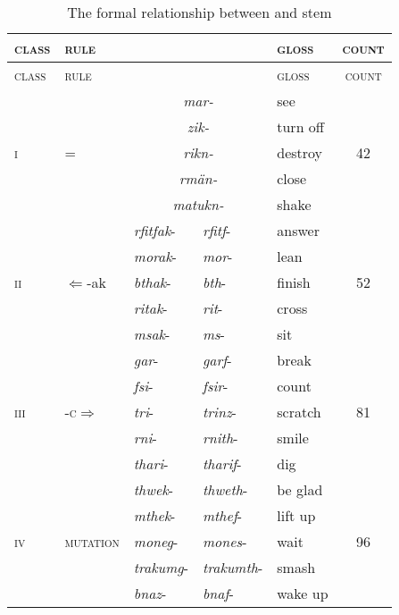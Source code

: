 \begin{table}
\caption{The formal relationship between \Ext{} and \Rs{} stem}
\begin{tabularx}{\textwidth}{lllllc}
\label{frbearr}\\
	\lsptoprule
	\textsc{class}&\textsc{rule} &\Ext{} &\Rs{} &\textsc{gloss} &\textsc{count}\\\hline
	\textsc{class}&\textsc{rule} &\Ext{} &\Rs{} &\textsc{gloss} &\textsc{count}\\\hline
	\multirow{5}{*}{\textsc{i}}	&\multirow{5}{*}{\Ext{}=\Rs{}} &\multicolumn{2}{c}{\emph{mar-}} &see &\multirow{5}{*}{\textsc{42}}\\
	&&\multicolumn{2}{c}{\emph{zik-}} &turn off &\\
	&&\multicolumn{2}{c}{\emph{rikn-}} &destroy &\\
	&&\multicolumn{2}{c}{\emph{rmän-}} &close &\\
	&&\multicolumn{2}{c}{\emph{matukn-}} &shake &\\\hline
	\multirow{5}{*}{\textsc{ii}} &\multirow{5}{*}{\Ext{}$\Leftarrow$\Rs-ak} &\emph{rfitfak}- &\emph{rfitf}- &answer &\multirow{5}{*}{\textsc{52}}\\
	&&\emph{morak}- &\emph{mor}- &lean &\\
	&&\emph{bthak}- &\emph{bth}- &finish &\\
	&&\emph{ritak}-	&\emph{rit}- &cross &\\
	&&\emph{msak}- &\emph{ms}-	&sit &\\\hline
	\multirow{5}{*}{\textsc{iii}} &\multirow{5}{*}{\Ext-\textsc{c}$\Rightarrow$\Rs} &\emph{gar}- &\emph{garf}- &break &\multirow{5}{*}{\textsc{81}}\\
	&&\emph{fsi}- &\emph{fsir}- &count &\\
	&&\emph{tri}- &\emph{trinz}- &scratch &\\
	&&\emph{rni}- &\emph{rnith}- &smile &\\
	&&\emph{thari}- &\emph{tharif}-	&dig &\\\hline
	\multirow{5}{*}{\textsc{iv}} &\multirow{5}{*}{\textsc{mutation}} &\emph{thwek}- &\emph{thweth}- &be glad &\multirow{5}{*}{\textsc{96}}\\
	&&\emph{mthek}- &\emph{mthef}- &lift up &\\
	&&\emph{moneg}-	&\emph{mones}- &wait &\\
	&&\emph{trakumg}- &\emph{trakumth}- &smash &\\
	&&\emph{bnaz}- &\emph{bnaf}- &wake up\\\hline

\end{tabularx}
\end{table}
